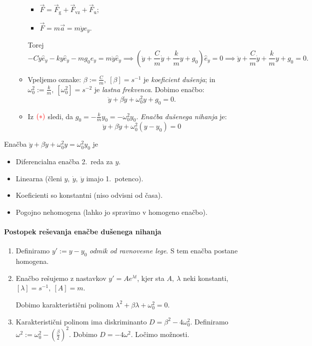 \begin{enumerate}
\begin{itemize}
        \begin{itemize}
            \item \(\vec{F} = \vec{F}_\text{g} + \vec{F}_\text{vz} + \vec{F}_\text{u}\);
            \item \(\vec{F} = m \vec{a} = m \ddot{y} \widehat{e}_y\).
        \end{itemize}
        Torej 
        \[
        -C \dot{y} \widehat{e}_y - ky\widehat{e}_y -mg_0 \widehat{e}_y = m \ddot{y} \widehat{e}_y \implies 
        \left( \ddot{y} + \frac{C}{m} \dot{y} + \frac{k}{m} y + g_0 \right) \widehat{e}_y = 0 \implies 
        \ddot{y} + \frac{C}{m} \dot{y} + \frac{k}{m} y + g_0 = 0.
        \]
        \item Vpeljemo oznake: \(\beta := \frac{C}{m}, \ [\beta]  = s^{-1}\) je \emph{koeficient dušenja}; in \( \omega_0^2 := \frac{k}{m}, \ [\omega_0^2] = s^{-2}\) je \emph{lastna frekvenca}. Dobimo enačbo:
        \[
        \ddot{y} + \beta \dot{y} + \omega_0^2 y + g_0 = 0.
        \]
        \item Iz \(\textcolor{red}{(*)}\) sledi, da \(g_0 = -\frac{k}{m}y_0 = - \omega_0^2y_0\).  
        \emph{Enačba dušenega nihanja} je:
        \[
        \boxed{\ddot{y} + \beta \dot{y} +  \omega_0^2 (y - y_0) = 0}
        \]        
    \end{itemize}
\end{enumerate}

\begin{opomba}
    Enačba \(\ddot{y} + \beta \dot{y} + \omega_0^2y = \omega_0^2 y_0\) je 
    \begin{itemize}
        \item Diferencialna enačba 2.\ reda za \(y\).
        \item Linearna (členi \(y, \ \dot{y}, \ \ddot{y}\) imajo 1.\ potenco).
        \item Koeficienti so konstantni (niso odvisni od časa).
        \item Pogojno nehomogena (lahko jo spravimo v homogeno enačbo).
    \end{itemize}
\end{opomba}

\paragraph{Postopek reševanja enačbe dušenega nihanja}
\begin{enumerate}
    \item Definiramo \(y' := y - y_0\) \emph{odmik od ravnovesne lege}. S tem enačba postane homogena.
    \item Enačbo rešujemo z nastavkov \(y' = A e^{\lambda t}\), kjer sta \(A, \ \lambda\) neki konstanti, \([\lambda] = s^{-1}, \ [A] = m\). 
    
    Dobimo karakteristični polinom \(\lambda^2 + \beta \lambda + \omega_0^2 = 0\).
    \item Karakteristični polinom ima diskriminanto \(D = \beta^2 - 4 \omega_0^2\). Definiramo \(\boxed{\omega^2 := \omega_0^2 - \left(\frac{\beta}{2}\right)^2}\). Dobimo \(D = - 4 \omega^2\). Ločimo možnosti.
\end{enumerate}

